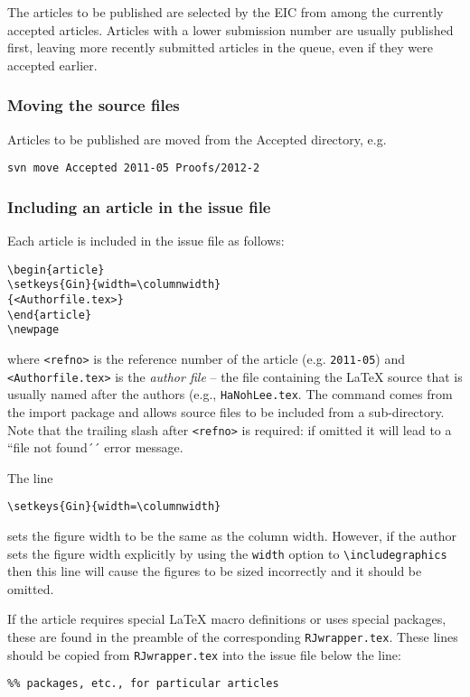\documentclass[11pt]{article}
\begin{document}
The articles to be published are selected by the EIC from among the
currently accepted articles. Articles with a lower submission number
are usually published first, leaving more recently submitted articles
in the queue, even if they were accepted earlier.

\subsubsection{Moving the source files}

Articles to be published are moved from the Accepted directory, e.g.
\begin{verbatim}
svn move Accepted 2011-05 Proofs/2012-2
\end{verbatim}

\subsubsection{Including an article in the issue file}

Each article is included in the issue file as follows:
\begin{verbatim}
\begin{article}
\setkeys{Gin}{width=\columnwidth}
{<Authorfile.tex>}
\end{article}
\newpage
\end{verbatim}
where \verb+<refno>+ is the reference number of the article
(e.g. \texttt{2011-05}) and \verb+<Authorfile.tex>+ is the {\em author
  file} -- the file containing the LaTeX source that is usually named
after the authors (e.g., \texttt{HaNohLee.tex}. The \verb++
command comes from the import package and allows source files to be
included from a sub-directory.  Note that the trailing slash after
\verb+<refno>+ is required: if omitted it will lead to a ``file not
found´´ error message.

The line 
\begin{verbatim}
\setkeys{Gin}{width=\columnwidth}
\end{verbatim}
sets the figure width to be the same as the column width. However, if
the author sets the figure width explicitly by using the
\texttt{width} option to \verb+\includegraphics+ then this line will
cause the figures to be sized incorrectly and it should be omitted.

If the article requires special LaTeX macro definitions or uses
special packages, these are found in the preamble of the
corresponding \texttt{RJwrapper.tex}. These lines should be copied
from \texttt{RJwrapper.tex} into the issue file below the line:
\begin{verbatim}
%% packages, etc., for particular articles 
\end{verbatim}
\end{document}
